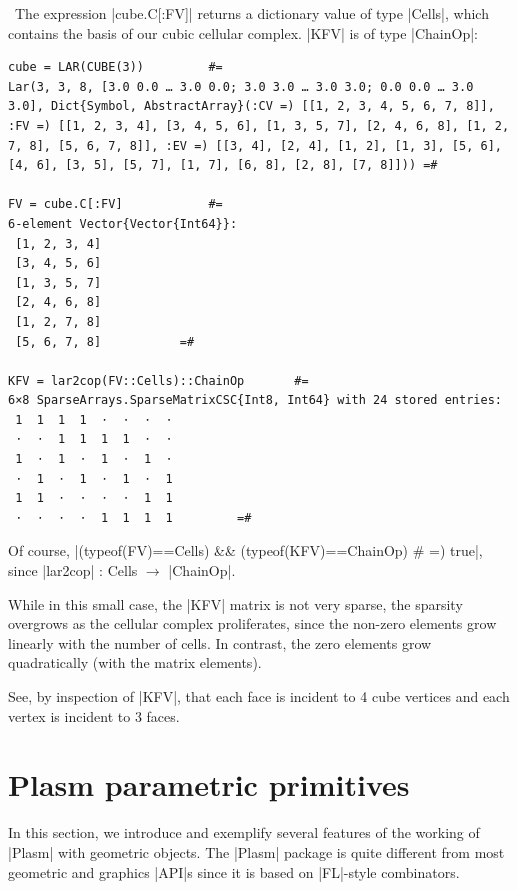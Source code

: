 \begin{coding}\
The expression |cube.C[:FV]| returns a dictionary value of type |Cells|, which contains the basis of our cubic cellular complex.  |KFV| is of type |ChainOp|:

\begin{lstlisting}[language=JuliaLocal, style=julia, mathescape = true] 
cube = LAR(CUBE(3))			#=
Lar(3, 3, 8, [3.0 0.0 … 3.0 0.0; 3.0 3.0 … 3.0 3.0; 0.0 0.0 … 3.0 3.0], Dict{Symbol, AbstractArray}(:CV =) [[1, 2, 3, 4, 5, 6, 7, 8]], :FV =) [[1, 2, 3, 4], [3, 4, 5, 6], [1, 3, 5, 7], [2, 4, 6, 8], [1, 2, 7, 8], [5, 6, 7, 8]], :EV =) [[3, 4], [2, 4], [1, 2], [1, 3], [5, 6], [4, 6], [3, 5], [5, 7], [1, 7], [6, 8], [2, 8], [7, 8]])) =#

FV = cube.C[:FV]			#=
6-element Vector{Vector{Int64}}:
 [1, 2, 3, 4]
 [3, 4, 5, 6]
 [1, 3, 5, 7]
 [2, 4, 6, 8]
 [1, 2, 7, 8]
 [5, 6, 7, 8]			=#

KFV = lar2cop(FV::Cells)::ChainOp		#=
6×8 SparseArrays.SparseMatrixCSC{Int8, Int64} with 24 stored entries:
 1  1  1  1  ⋅  ⋅  ⋅  ⋅
 ⋅  ⋅  1  1  1  1  ⋅  ⋅
 1  ⋅  1  ⋅  1  ⋅  1  ⋅
 ⋅  1  ⋅  1  ⋅  1  ⋅  1
 1  1  ⋅  ⋅  ⋅  ⋅  1  1
 ⋅  ⋅  ⋅  ⋅  1  1  1  1			=#
\end{lstlisting}
Of course, |(typeof(FV)==Cells) && (typeof(KFV)==ChainOp) # =) true|, 
since |lar2cop| : Cells $\to$ |ChainOp|.
\end{coding}

\begin{remark}
While in this small case, the |KFV| matrix is not very sparse, the sparsity overgrows as the cellular complex proliferates, since the non-zero elements grow linearly with the number of cells. In contrast, the zero elements grow quadratically (with the matrix elements).
\end{remark}
\begin{remark}
See, by inspection of |KFV|, that each face is incident to 4 cube vertices and each vertex is incident to 3 faces.
\end{remark}


\section{Plasm parametric primitives}\label{sect:4-2}

In this section, we introduce and exemplify several features of the working of |Plasm| with geometric objects. The |Plasm| package is quite different from most geometric and graphics |API|s since it is based on |FL|-style combinators.


